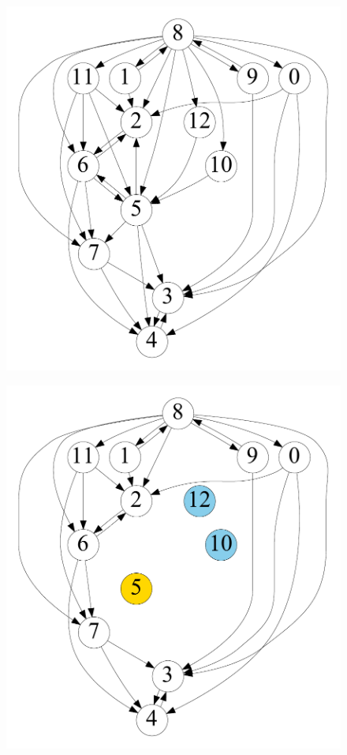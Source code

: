 \begin{figure}[t]
	\centering
	\begin{minipage}[b]{0.19\linewidth}
		\captionsetup{type=figure}
		\centering
		{\includegraphics[width=\textwidth]{./alg_fig/simple-g0}}
	\end{minipage}
	\begin{minipage}[b]{0.19\linewidth}
		\centering
		{\includegraphics[width=\textwidth]{./alg_fig/simple-g2}}

\end{minipage}
\end{figure}
